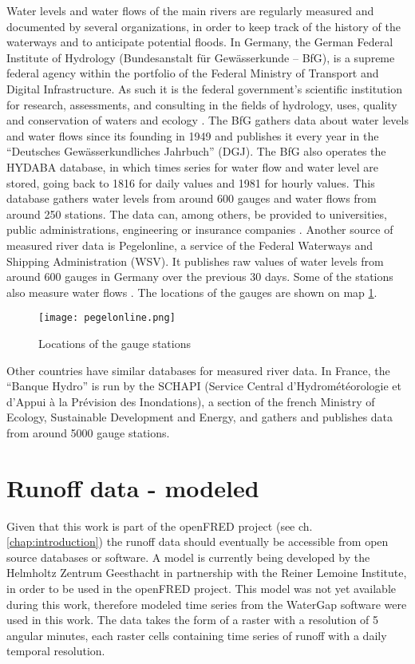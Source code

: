 \label{sec:meas_runoff}
Water levels and water flows of the main rivers are regularly measured and documented by several organizations, in order to keep track of the history of the waterways and to anticipate potential floods. In Germany, the German Federal Institute of Hydrology (Bundesanstalt für Gewässerkunde – BfG), is a supreme federal agency within the portfolio of the Federal Ministry of Transport and Digital Infrastructure. As such it is the federal government's scientific institution for research, assessments, and consulting in the fields of hydrology, uses, quality and conservation of waters and ecology \cite{bafg}. The BfG gathers data about water levels and water flows since its founding in 1949 and publishes it every year in the ``Deutsches Gewässerkundliches Jahrbuch'' (DGJ). The BfG also operates the HYDABA database, in which times series for water flow and water level are stored, going back to 1816 for daily values and 1981 for hourly values. This database gathers water levels from around 600 gauges and water flows from around 250 stations. The data can, among others, be provided to universities, public administrations, engineering or insurance companies \cite{bafg_hyd}. \newline
Another source of measured river data is Pegelonline, a service of the Federal Waterways and Shipping Administration (WSV). It publishes raw values of water levels from around 600 gauges in Germany over the previous 30 days. Some of the stations also measure water flows \cite{pegelonline}. The locations of the gauges are shown on map \ref{pegelonline}.

\begin{figure}[H]
\centering
\texttt{[image: pegelonline.png]}
\caption[Locations of the gauge stations]{Locations of the gauge stations \cite{pegelonline}}
\label{pegelonline}
\end{figure}

Other countries have similar databases for measured river data. In France, the ``Banque Hydro'' is run by the SCHAPI (Service Central d'Hydrométéorologie et d'Appui à la Prévision des Inondations), a section of the french Ministry of Ecology, Sustainable Development and Energy, and gathers and publishes data from around 5000 gauge stations.

\section{Runoff data - modeled}

\label{sec:mod_runoff}

Given that this work is part of the openFRED project (see ch. \ref{chap:introduction}) the runoff data should eventually be accessible from open source databases or software. A model is currently being developed by the Helmholtz Zentrum Geesthacht in partnership with the Reiner Lemoine Institute, in order to be used in the openFRED project. This model was not yet available during this work, therefore modeled time series from the WaterGap software were used in this work. The data takes the form of a raster with a resolution of 5 angular minutes, each raster cells containing time series of runoff with a daily temporal resolution.
